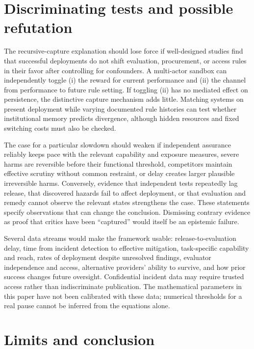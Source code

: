 \documentclass[11pt]{article}
\begin{document}
\section{Discriminating tests and possible refutation}

The recursive-capture explanation should lose force if well-designed studies find that successful deployments do not shift evaluation, procurement, or access rules in their favor after controlling for confounders. A multi-actor sandbox can independently toggle (i) the reward for current performance and (ii) the channel from performance to future rule setting. If toggling (ii) has no mediated effect on persistence, the distinctive capture mechanism adds little. Matching systems on present deployment while varying documented rule histories can test whether institutional memory predicts divergence, although hidden resources and fixed switching costs must also be checked.

The case for a particular slowdown should weaken if independent assurance reliably keeps pace with the relevant capability and exposure measures, severe harms are reversible before their functional threshold, competitors maintain effective scrutiny without common restraint, or delay creates larger plausible irreversible harms. Conversely, evidence that independent tests repeatedly lag release, that discovered hazards fail to affect deployment, or that evaluation and remedy cannot observe the relevant states strengthens the case. These statements specify observations that can change the conclusion. Dismissing contrary evidence as proof that critics have been ``captured'' would itself be an epistemic failure.

Several data streams would make the framework usable: release-to-evaluation delay, time from incident detection to effective mitigation, task-specific capability and reach, rates of deployment despite unresolved findings, evaluator independence and access, alternative providers' ability to survive, and how prior success changes future oversight. Confidential incident data may require trusted access rather than indiscriminate publication. The mathematical parameters in this paper have not been calibrated with these data; numerical thresholds for a real pause cannot be inferred from the equations alone.

\section{Limits and conclusion}
\end{document}
